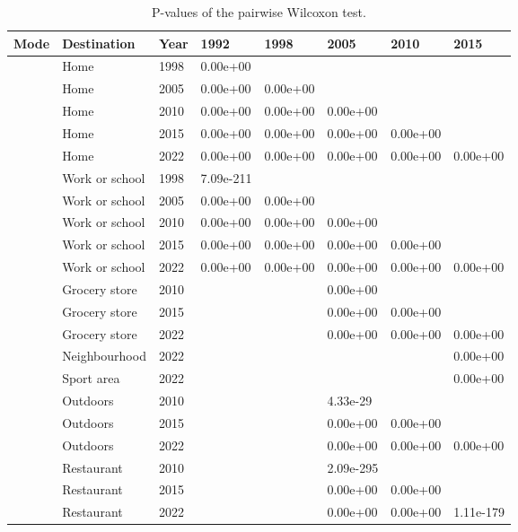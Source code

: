 \documentclass[preprint, 3p,
authoryear]{elsarticle} %
\begin{document}
\begin{longtable}[t]{llllllll}
\caption{\label{tab:kruskal-walking}\label{tab:result-stats}P-values of the pairwise Wilcoxon test.}\\
\toprule
Mode & Destination & Year & 1992 & 1998 & 2005 & 2010 & 2015\\
\midrule
 & Home & 1998 & 0.00e+00 &  &  &  & \\
\nopagebreak
 & Home & 2005 & 0.00e+00 & 0.00e+00 &  &  & \\
\nopagebreak
 & Home & 2010 & 0.00e+00 & 0.00e+00 & 0.00e+00 &  & \\
\nopagebreak
 & Home & 2015 & 0.00e+00 & 0.00e+00 & 0.00e+00 & 0.00e+00 & \\
\nopagebreak
 & Home & 2022 & 0.00e+00 & 0.00e+00 & 0.00e+00 & 0.00e+00 & 0.00e+00\\
\nopagebreak
 & Work or school & 1998 & 7.09e-211 &  &  &  & \\
\nopagebreak
 & Work or school & 2005 & 0.00e+00 & 0.00e+00 &  &  & \\
\nopagebreak
 & Work or school & 2010 & 0.00e+00 & 0.00e+00 & 0.00e+00 &  & \\
\nopagebreak
 & Work or school & 2015 & 0.00e+00 & 0.00e+00 & 0.00e+00 & 0.00e+00 & \\
\nopagebreak
 & Work or school & 2022 & 0.00e+00 & 0.00e+00 & 0.00e+00 & 0.00e+00 & 0.00e+00\\
\nopagebreak
 & Grocery store & 2010 &  &  & 0.00e+00 &  & \\
\nopagebreak
 & Grocery store & 2015 &  &  & 0.00e+00 & 0.00e+00 & \\
\nopagebreak
 & Grocery store & 2022 &  &  & 0.00e+00 & 0.00e+00 & 0.00e+00\\
\nopagebreak
 & Neighbourhood & 2022 &  &  &  &  & 0.00e+00\\
\nopagebreak
 & Sport area & 2022 &  &  &  &  & 0.00e+00\\
\nopagebreak
 & Outdoors & 2010 &  &  & 4.33e-29 &  & \\
\nopagebreak
 & Outdoors & 2015 &  &  & 0.00e+00 & 0.00e+00 & \\
\nopagebreak
 & Outdoors & 2022 &  &  & 0.00e+00 & 0.00e+00 & 0.00e+00\\
\nopagebreak
 & Restaurant & 2010 &  &  & 2.09e-295 &  & \\
\nopagebreak
 & Restaurant & 2015 &  &  & 0.00e+00 & 0.00e+00 & \\
\nopagebreak
 & Restaurant & 2022 &  &  & 0.00e+00 & 0.00e+00 & 1.11e-179\\

\end{longtable}
\end{document}
